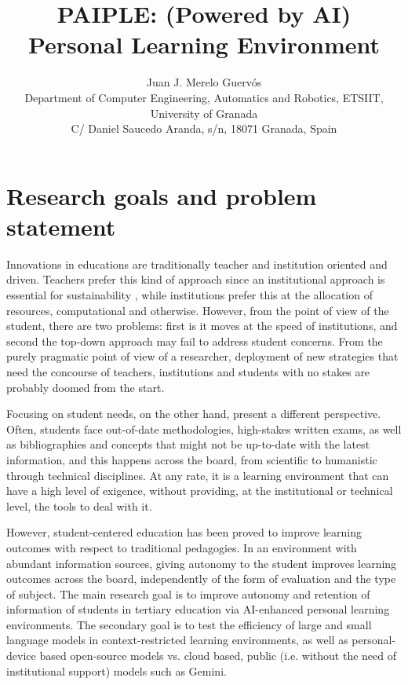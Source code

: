 \documentclass[a4paper,12pt]{article}
\title{PAIPLE: (Powered by AI) Personal Learning Environment}
\author{Juan J. Merelo Guervós\\
\footnotesize Department of Computer Engineering, Automatics
and Robotics, ETSIIT, University of Granada\\
\footnotesize C/ Daniel Saucedo
  Aranda, s/n, 18071 Granada, Spain}
\date{}
\begin{document}
\maketitle


\section{Research goals and problem statement}

Innovations in educations are traditionally teacher and institution oriented and
driven. Teachers prefer this kind of approach since an institutional approach is
essential for sustainability \cite{DBLP:journals/eait/MereloCMBAGT24}, while
institutions prefer this at the allocation of resources, computational and
otherwise. However, from the point of view of the student, there are two
problems: first is it moves at the speed of institutions, and second the
top-down approach may fail to address student concerns. From the purely
pragmatic point of view of a researcher, deployment of new strategies that need
the concourse of teachers, institutions and students with no stakes are probably
doomed from the start.

Focusing on student needs, on the other hand, present a different
perspective. Often, students face out-of-date methodologies, high-stakes written
exams, as well as bibliographies and concepts that might not be up-to-date with
the latest information, and this happens across the board, from scientific to
humanistic through technical disciplines. At any rate, it is a learning
environment that can have a high level of exigence, without providing, at the
institutional or technical level, the tools to deal with it.

However, student-centered education has been proved to improve learning
outcomes\cite{kaput2018evidence} with respect to traditional pedagogies. In an
environment with abundant information sources, giving autonomy to the student
improves learning outcomes across the board, independently of the form of
evaluation and the type of subject. The main research goal is to improve
autonomy and retention of information of students in tertiary education via
AI-enhanced personal learning environments. The secondary goal is to test the
efficiency of large and small language models in context-restricted learning
environments, as well as personal-device based open-source models vs. cloud
based, public (i.e. without the need of institutional support) models such as
Gemini.
\end{document}
